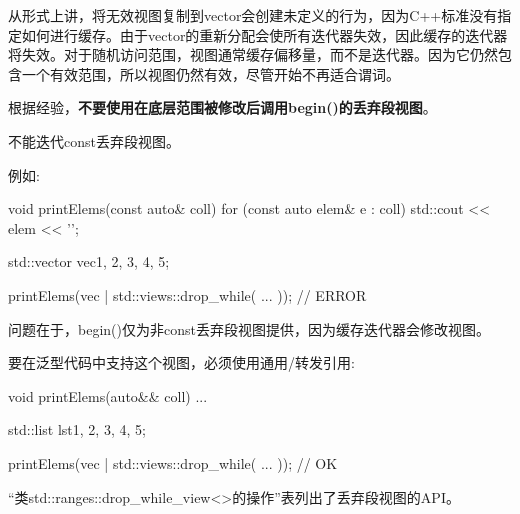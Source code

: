 从形式上讲，将无效视图复制到vector会创建未定义的行为，因为C++标准没有指定如何进行缓存。由于vector的重新分配会使所有迭代器失效，因此缓存的迭代器将失效。对于随机访问范围，视图通常缓存偏移量，而不是迭代器。因为它仍然包含一个有效范围，所以视图仍然有效，尽管开始不再适合谓词。

根据经验，\textbf{不要使用在底层范围被修改后调用begin()的丢弃段视图}。


不能迭代const丢弃段视图。

例如:

\begin{cpp}
void printElems(const auto& coll) {
	for (const auto elem& e : coll) {
		std::cout << elem << '\n';
	}
}

std::vector vec{1, 2, 3, 4, 5};

printElems(vec | std::views::drop_while( ... )); // ERROR
\end{cpp}

问题在于，begin()仅为非const丢弃段视图提供，因为缓存迭代器会修改视图。

要在泛型代码中支持这个视图，必须使用通用/转发引用:

\begin{cpp}
void printElems(auto&& coll) {
	...
}

std::list lst{1, 2, 3, 4, 5};

printElems(vec | std::views::drop_while( ... )); // OK
\end{cpp}


“类std::ranges::drop\_while\_view<>的操作”表列出了丢弃段视图的API。

